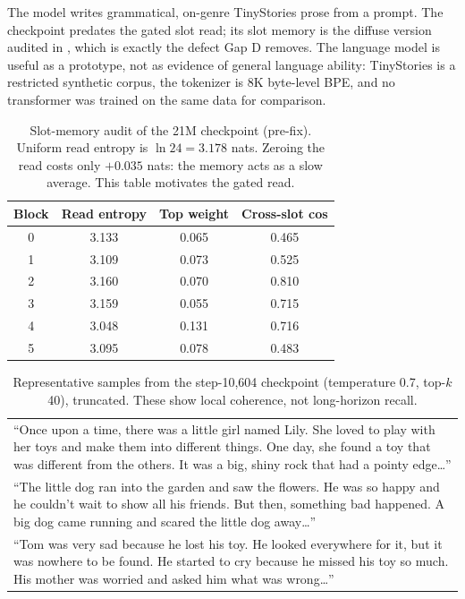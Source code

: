 The model writes grammatical, on-genre TinyStories prose from a prompt. The checkpoint
predates the gated slot read; its slot memory is the diffuse version audited in
, which is exactly the defect Gap D removes. The language model is useful
as a prototype, not as evidence of general language ability: TinyStories is a restricted
synthetic corpus, the tokenizer is 8K byte-level BPE, and no transformer was trained on the
same data for comparison.

\begin{table}[t]
\centering
\caption{Slot-memory audit of the 21M checkpoint (pre-fix). Uniform read entropy is
$\ln24=3.178$ nats. Zeroing the read costs only $+0.035$ nats: the memory acts as a slow
average. This table motivates the gated read.}
\label{tab:slotaudit}
\small
\begin{tabular}{@{}c c c c@{}}
\toprule
Block & Read entropy & Top weight & Cross-slot cos \\
\midrule
0 & 3.133 & 0.065 & 0.465 \\
1 & 3.109 & 0.073 & 0.525 \\
2 & 3.160 & 0.070 & 0.810 \\
3 & 3.159 & 0.055 & 0.715 \\
4 & 3.048 & 0.131 & 0.716 \\
5 & 3.095 & 0.078 & 0.483 \\
\bottomrule
\end{tabular}
\end{table}

\begin{table}[t]
\centering
\caption{Representative samples from the step-10{,}604 checkpoint (temperature 0.7, top-$k$ 40),
truncated. These show local coherence, not long-horizon recall.}
\label{tab:samples}
\small
\begin{tabularx}{\textwidth}{@{}>{\raggedright\arraybackslash}X@{}}
\toprule
``Once upon a time, there was a little girl named Lily. She loved to play with her toys and
make them into different things. One day, she found a toy that was different from the others.
It was a big, shiny rock that had a pointy edge\ldots'' \\
``The little dog ran into the garden and saw the flowers. He was so happy and he couldn't wait
to show all his friends. But then, something bad happened. A big dog came running and scared
the little dog away\ldots'' \\
``Tom was very sad because he lost his toy. He looked everywhere for it, but it was nowhere to
be found. He started to cry because he missed his toy so much. His mother was worried and
asked him what was wrong\ldots'' \\
\bottomrule
\end{tabularx}
\end{table}


